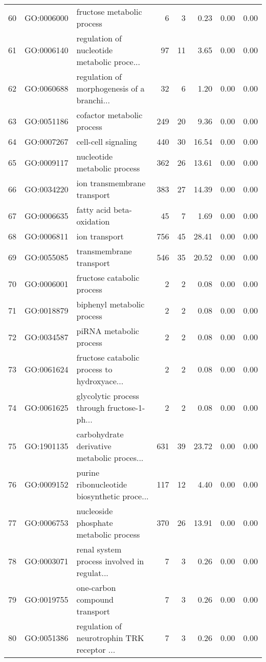 \begin{table}[ht]
\begin{tabular}{rllrrrrr}
  60 & GO:0006000 & fructose metabolic process &   6 &   3 & 0.23 & 0.00 & 0.00 \\ 
  61 & GO:0006140 & regulation of nucleotide metabolic proce... &  97 &  11 & 3.65 & 0.00 & 0.00 \\ 
  62 & GO:0060688 & regulation of morphogenesis of a branchi... &  32 &   6 & 1.20 & 0.00 & 0.00 \\ 
  63 & GO:0051186 & cofactor metabolic process & 249 &  20 & 9.36 & 0.00 & 0.00 \\ 
  64 & GO:0007267 & cell-cell signaling & 440 &  30 & 16.54 & 0.00 & 0.00 \\ 
  65 & GO:0009117 & nucleotide metabolic process & 362 &  26 & 13.61 & 0.00 & 0.00 \\ 
  66 & GO:0034220 & ion transmembrane transport & 383 &  27 & 14.39 & 0.00 & 0.00 \\ 
  67 & GO:0006635 & fatty acid beta-oxidation &  45 &   7 & 1.69 & 0.00 & 0.00 \\ 
  68 & GO:0006811 & ion transport & 756 &  45 & 28.41 & 0.00 & 0.00 \\ 
  69 & GO:0055085 & transmembrane transport & 546 &  35 & 20.52 & 0.00 & 0.00 \\ 
  70 & GO:0006001 & fructose catabolic process &   2 &   2 & 0.08 & 0.00 & 0.00 \\ 
  71 & GO:0018879 & biphenyl metabolic process &   2 &   2 & 0.08 & 0.00 & 0.00 \\ 
  72 & GO:0034587 & piRNA metabolic process &   2 &   2 & 0.08 & 0.00 & 0.00 \\ 
  73 & GO:0061624 & fructose catabolic process to hydroxyace... &   2 &   2 & 0.08 & 0.00 & 0.00 \\ 
  74 & GO:0061625 & glycolytic process through fructose-1-ph... &   2 &   2 & 0.08 & 0.00 & 0.00 \\ 
  75 & GO:1901135 & carbohydrate derivative metabolic proces... & 631 &  39 & 23.72 & 0.00 & 0.00 \\ 
  76 & GO:0009152 & purine ribonucleotide biosynthetic proce... & 117 &  12 & 4.40 & 0.00 & 0.00 \\ 
  77 & GO:0006753 & nucleoside phosphate metabolic process & 370 &  26 & 13.91 & 0.00 & 0.00 \\ 
  78 & GO:0003071 & renal system process involved in regulat... &   7 &   3 & 0.26 & 0.00 & 0.00 \\ 
  79 & GO:0019755 & one-carbon compound transport &   7 &   3 & 0.26 & 0.00 & 0.00 \\ 
  80 & GO:0051386 & regulation of neurotrophin TRK receptor ... &   7 &   3 & 0.26 & 0.00 & 0.00 \\ 

\end{tabular}
\end{table}
